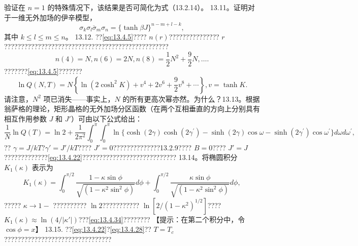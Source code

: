 验证在 \(n=1\) 的特殊情况下，该结果是否可简化为式（13.2.14）。
13.11。证明对于一维无外加场的伊辛模型，
\begin{equation}\tag{13.7.31}\label{eq:13.7.31}
\overline { { \sigma _ { k } \sigma _ { l } \sigma _ { m } \sigma _ { n } } } = \{ \operatorname { t a n h } \beta J \} ^{n - m + l - k} ,
\end{equation}
其中 \(k \leq l \leq m \leq n\)。
13.12. ??\autoref{eq:13.4.5}???? \(n(r)\)??????????????? \(r\) ?????????????????????????????????????????????????
\begin{equation}\tag{13.7.32}\label{eq:13.7.32}
n ( 4 ) = N ,  n ( 6 ) = 2 N ,  n ( 8 ) = { \frac { 1 } { 2 } } N ^{2} + { \frac { 9 } { 2 } } N , \ldots .
\end{equation}
???????\autoref{eq:13.4.5}???????
\begin{equation}\tag{13.7.33}\label{eq:13.7.33}
\ln Q ( N , T ) = N \left\{ \ln ( 2 \cosh ^{2} K ) + v ^{4} + 2 v ^{6} + \frac { 9 } { 2 } v ^{8} + \cdots \right\} , v = \operatorname { t a n h } K .
\end{equation}
请注意，\(N^{2}\) 项已消失——事实上，\(N\) 的所有更高次幂亦然。为什么？13.13。根据翁萨格的理论，矩形晶格的无外加场分区函数（在两个互相垂直的方向上分别具有相互作用参数 \(J\) 和 \(J'\)）可由以下公式给出：
\begin{equation}\tag{13.7.34}\label{eq:13.7.34}
\frac { 1 } { N } \ln Q ( T ) = \ln 2 + \frac { 1 } { 2 \pi ^{2} } \int _ { 0 } ^{\pi} \int _ { 0 } ^{\pi} \ln \{ \cosh ( 2 \gamma ) \cosh ( 2 \gamma ^{\prime} ) - \sinh ( 2 \gamma ) \cos \omega - \sinh ( 2 \gamma ^{\prime} ) \cos \omega ^{\prime} \} d \omega d \omega ^{\prime} ,
\end{equation}
?? \(\gamma=J/kT\)?\(\gamma\prime=J\prime/kT\)???? \(J\prime=0\)??????????????13.2.9???? \(B=0\)???? \(J\prime=J\)?????????????\autoref{eq:13.4.22}????????????????????????????
13.14。将椭圆积分 \(K_{1}(\kappa)\) 表示为
\begin{equation}\tag{13.7.35}\label{eq:13.7.35}
K _ { 1 } ( \kappa ) = \int _ { 0 } ^{\pi / 2} \frac { 1 - \kappa \sin \phi } { \sqrt { ( 1 - \kappa ^{2} \sin ^{2} \phi ) } } d \phi + \int _ { 0 } ^{\pi / 2} \frac { \kappa \sin \phi } { \sqrt { ( 1 - \kappa ^{2} \sin ^{2} \phi ) } } d \phi ,
\end{equation}
????? \(\kappa \to 1-\) ?????????? \(\ln 2\)??????????? \(\ln[2/(1-\kappa^2)^{1/2}]\)????\(K_1(\kappa) \approx \ln(4/|\kappa\prime|)\)???\autoref{eq:13.4.34}????????
【提示：在第二个积分中，令 \(\cos\phi = x\)】
13.15. ??\autoref{eq:13.4.22}?\autoref{eq:13.4.28}?? \(T = T_c\) ????????????????????????????????
